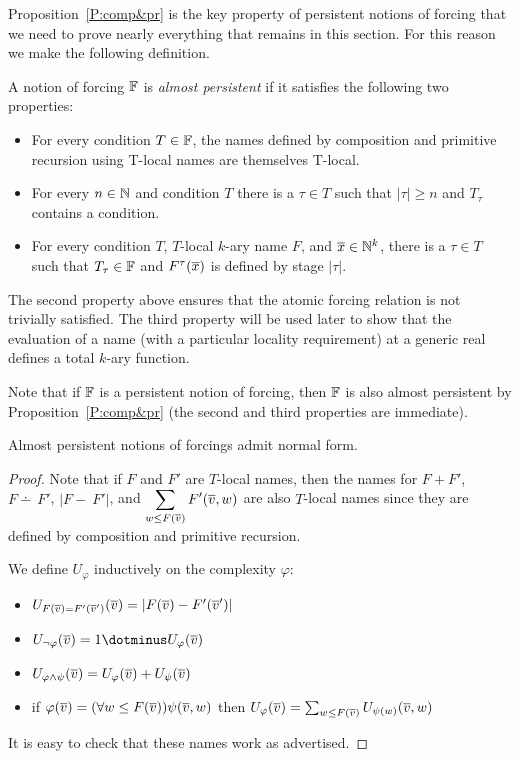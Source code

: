 Proposition~\ref{P:comp&pr} is the key property
of persistent notions of forcing that we need
to prove nearly everything that remains in this section.
For this reason we make the following definition.

\begin{definition}\label{D:almostP}
A notion of forcing $\mathbb{F}$ is \textit{almost persistent}
if it satisfies the following two properties:
\begin{itemize}
\item For every condition $T\in\mathbb{F}$, the names defined by composition and primitive
		recursion using T-local names are themselves T-local.
\item For every $n\in\mathbb{N}$ and condition $T$ there is a $\tau\in T$ such that $|\tau|\geq n$
		and $T_\tau$ contains a condition.
\item For every condition $T$, $T$-local $k$-ary name $F$, and $\overline{x}\in\mathbb{N}^k$, there is a $\tau\in T$
		such that $T_\tau\in\mathbb{F}$ and $F^\tau(\overline{x})$ is defined by stage $|\tau|$.
\end{itemize}
\end{definition}

The second property above ensures that the atomic forcing relation is not trivially satisfied.
The third property will be used later to show that the evaluation of a name
(with a particular locality requirement) at a generic real defines a total $k$-ary function.

Note that if $\mathbb{F}$ is a persistent notion of forcing,
then $\mathbb{F}$ is also almost persistent by Proposition~\ref{P:comp&pr}
(the second and third properties are immediate).

\begin{prop}[$\RCAo$]\label{P:PR:normalForm}
Almost persistent notions of forcings admit normal form.
\end{prop}

\begin{proof}
Note that if $F$ and $F'$ are $T$-local names, then the names for
$F+F'$, $F\dotminus~F'$, $|F-~F'|$, and $\displaystyle \sum_{w\leq F(\overline{v})}F'(\overline{v},w)$
are also $T$-local names since they are defined by
composition and primitive recursion.

We define $U_\varphi$ inductively on the complexity $\varphi$:
\begin{itemize}
\item $U_{F(\overline{v})=F'(\overline{v}')}(\overline{v})=|F(\overline{v})-F'(\overline{v}')|$
\item $U_{\neg\varphi}(\tup{v})=1\dotminus U_\varphi(\tup{v})$
\item $U_{\varphi\land\psi}(\overline{v})=U_\varphi(\overline{v})+U_\psi(\overline{v})$
\item if $\varphi(\overline{v})=(\forall w\leq F(\overline{v}))\psi(\overline{v},w)$ then
		$U_{\varphi}(\overline{v})=\sum_{w\leq F(\overline{v})} U_{\psi(w)}(\overline{v},w)$
\end{itemize}
It is easy to check that these names work as advertised.
\end{proof}


